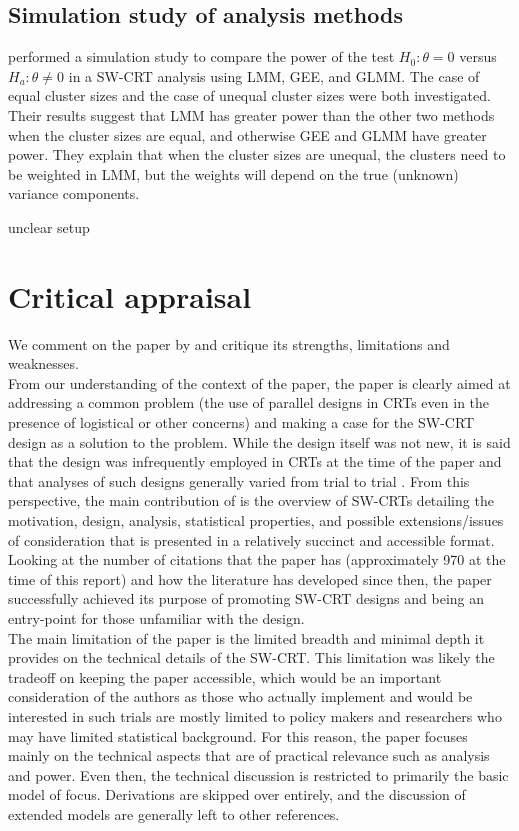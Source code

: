 \documentclass[10pt]{article}
\begin{document}
\subsection{Simulation study of analysis methods}

\textcite{Hussey:2007} performed a simulation study to compare the power of the test $H_0:\theta=0$ versus $H_a:\theta\neq0$ in a SW-CRT analysis using LMM, GEE, and GLMM. The case of equal cluster sizes and the case of unequal cluster sizes were both investigated. Their results suggest that LMM has greater power than the other two methods when the cluster sizes are equal, and otherwise GEE and GLMM have greater power. They explain that when the cluster sizes are unequal, the clusters need to be weighted in LMM, but the weights will depend on the true (unknown) variance components.

\todo unclear setup


\section{Critical appraisal} \label{sec:critique}

We comment on the paper by \textcite{Hussey:2007} and critique its strengths, limitations and weaknesses.
\\

From our understanding of the context of the paper, the paper is clearly aimed at addressing a common problem (the use of parallel designs in CRTs even in the presence of logistical or other concerns) and making a case for the SW-CRT design as a solution to the problem. While the design itself was not new, it is said that the design was infrequently employed in CRTs at the time of the paper and that analyses of such designs generally varied from trial to trial \parencite{Brown:2006}. From this perspective, the main contribution of \citeauthor{Hussey:2007} is the overview of SW-CRTs detailing the motivation, design, analysis, statistical properties, and possible extensions/issues of consideration that is presented in a relatively succinct and accessible format. Looking at the number of citations that the paper has (approximately 970 at the time of this report) and how the literature has developed since then, the paper successfully achieved its purpose of promoting SW-CRT designs and being an entry-point for those unfamiliar with the design.
\\

The main limitation of the paper is the limited breadth and minimal depth it provides on the technical details of the SW-CRT. This limitation was likely the tradeoff on keeping the paper accessible, which would be an important consideration of the authors as those who actually implement and would be interested in such trials are mostly limited to policy makers and researchers who may have limited statistical background. For this reason, the paper focuses mainly on the technical aspects that are of practical relevance such as analysis and power. Even then, the technical discussion is restricted to primarily the basic model of focus. Derivations are skipped over entirely, and the discussion of extended models are generally left to other references.
\\
\end{document}
